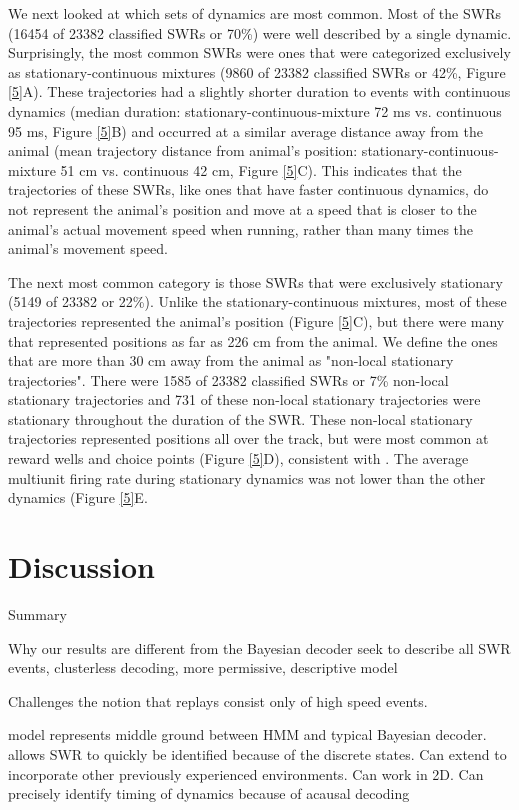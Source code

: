 \documentclass[times, twoside]{zHenriquesLab-StyleBioRxiv}
\begin{document}
We next looked at which sets of dynamics are most common. Most of the SWRs (16454 of 23382 classified SWRs or 70\%) were well described by a single dynamic. Surprisingly, the most common SWRs were ones that were categorized exclusively as stationary-continuous mixtures (9860 of 23382 classified SWRs or 42\%, Figure \ref{5}A). These trajectories had a slightly shorter duration to events with continuous dynamics (median duration: stationary-continuous-mixture 72 ms vs. continuous 95 ms, Figure \ref{5}B) and occurred at a similar average distance away from the animal (mean trajectory distance from animal's position: stationary-continuous-mixture 51 cm vs. continuous 42 cm, Figure \ref{5}C). This indicates that the trajectories of these SWRs, like ones that have faster continuous dynamics, do not represent the animal's position and move at a speed that is closer to the animal's actual movement speed when running, rather than many times the animal's movement speed.

The next most common category is those SWRs that were exclusively stationary (5149 of 23382 or 22\%). Unlike the stationary-continuous mixtures, most of these trajectories represented the animal's position (Figure \ref{5}C), but there were many that represented positions as far as 226 cm from the animal. We define the ones that are more than 30 cm away from the animal as "non-local stationary trajectories". There were 1585 of 23382 classified SWRs or 7\% non-local stationary trajectories and 731 of these non-local stationary trajectories were stationary throughout the duration of the SWR. These non-local stationary trajectories represented positions all over the track, but were most common at reward wells and choice points (Figure \ref{5}D), consistent with \cite{JaiDistincthippocampalcorticalmemory2017}. The average multiunit firing rate during stationary dynamics was not lower than the other dynamics (Figure \ref{5}E.

\section*{Discussion}

Summary

Why our results are different from the Bayesian decoder
seek to describe all SWR events, clusterless decoding, more permissive, descriptive model

Challenges the notion that replays consist only of high speed events.

model represents middle ground between HMM and typical Bayesian decoder. allows SWR to quickly be identified because of the discrete states. Can extend to incorporate other previously experienced environments. Can work in 2D. Can precisely identify timing of dynamics because of acausal decoding
\end{document}
